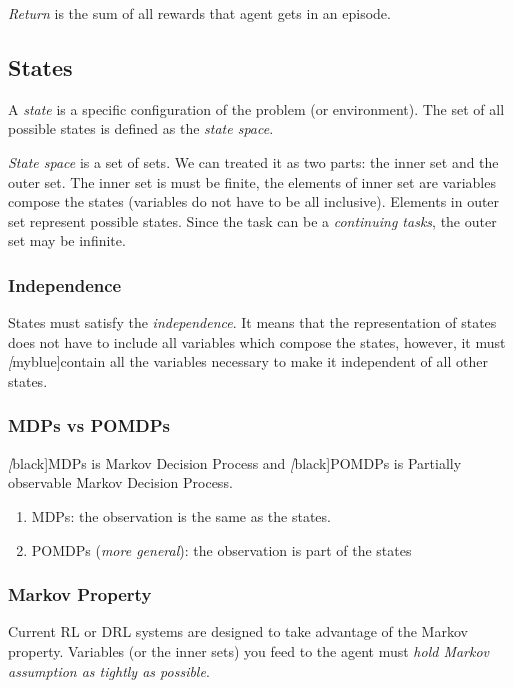 \emph{Return} is the sum of all rewards that agent gets in an episode. \par

\subsection{States}

A \emph{state} is a specific configuration of the problem (or environment). The set of all possible states is defined as
the \emph{state space}. \par \emph{State space} is a set of sets. We can treated it as two parts: the inner set and the
outer set. The inner set is must be finite, the elements of inner set are variables compose the states (variables do not
have to be all inclusive). Elements in outer set represent possible states. Since the task can be a {\itshape continuing
  tasks}, the outer set may be infinite.

\subsubsection*{Independence} States must satisfy the \emph{independence}. It means that the representation of states
does not have to include all variables which compose the states, however, it must \emph[myblue]{contain all the
  variables necessary to make it independent of all other states}. \par

\subsubsection*{MDPs vs POMDPs} \emph[black]{MDPs} is Markov Decision Process and \emph[black]{POMDPs} is Partially
observable Markov Decision Process. \par
\begin{enumerate}
\item
  MDPs: the observation is the same as the states.
\item
  POMDPs ({\itshape more general}): the observation is part of the states
\end{enumerate}

\subsubsection*{Markov Property} Current RL or DRL systems are designed to take advantage of the Markov property.
Variables (or the inner sets) you feed to the agent must \emph{hold Markov assumption as tightly as possible}.

